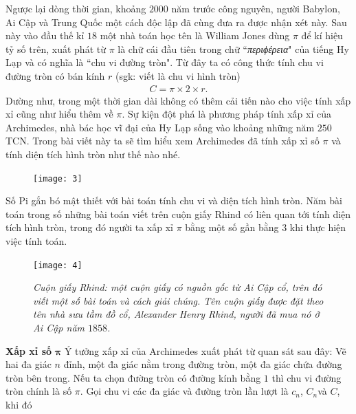 \begin{multicols}{2}
\begin{center}
{}
	\end{center}
	Ngược lại dòng thời gian, khoảng $2000$ năm trước công nguyên, người Babylon, Ai Cập và Trung Quốc một cách độc lập đã cùng đưa ra được nhận xét này. Sau này vào đầu thế kỉ $18$ một nhà toán học tên là William Jones dùng $\pi$ để kí hiệu tỷ số trên, xuất phát từ $\pi$ là chữ cái đầu tiên trong chữ ``\textit{περιϕέρεια}" của tiếng Hy Lạp và có nghĩa là ``chu vi đường tròn".
	\vskip 0.1cm
	Từ đây ta có công thức tính chu vi đường tròn có bán kính $r$ (sgk: viết là chu vi hình tròn)
	\begin{align*}
		C=\pi\times2\times r.
	\end{align*}
	Dường như, trong một thời gian dài không có thêm cải tiến nào cho việc tính xấp xỉ cũng như hiểu thêm về $\pi$. Sự kiện đột phá là phương pháp tính xấp xỉ của Archimedes, nhà bác học vĩ đại của Hy Lạp sống vào khoảng những năm $250$ TCN. Trong bài viết này ta sẽ tìm hiểu xem Archimedes đã tính xấp xỉ số $\pi$ và tính diện tích hình tròn như thế nào nhé.
	\begin{figure}[H]
		\vspace*{-5pt}
		\centering
		\captionsetup{labelformat= empty, justification=centering}
		\texttt{[image: 3]}
		\vspace*{-10pt}
	\end{figure}
	Số Pi gắn bó mật thiết với bài toán tính chu vi và diện tích hình tròn. Năm bài toán trong số những bài toán viết trên cuộn giấy Rhind  có liên quan tới tính diện tích hình tròn, trong đó người ta xấp xỉ $\pi$ bằng một số gần bằng $3$ khi thực hiện việc tính toán. 
	\begin{figure}[H]
		\vspace*{-5pt}
		\centering
		\captionsetup{labelformat= empty, justification=centering}
		\texttt{[image: 4]}
		\caption{\small\textit{\color{toancuabi}Cuộn giấy Rhind: một cuộn giấy có nguồn gốc từ Ai Cập cổ, trên đó viết một số bài toán và cách giải chúng. Tên cuộn giấy được đặt theo tên nhà sưu tầm đồ cổ, Alexander Henry Rhind, người đã mua nó ở Ai Cập năm $1858$.}}
		\vspace*{-10pt}
	\end{figure}
	\textbf{\color{toancuabi}Xấp xỉ số} $\pmb{\pi}$ 
	\vskip 0.1cm
	Ý tưởng xấp xỉ của Archimedes xuất phát từ quan sát sau đây: Vẽ hai  đa giác $n$ đỉnh, một đa giác nằm trong đường tròn, một đa giác chứa đường tròn bên trong. Nếu ta chọn đường tròn có đường kính bằng $1$ thì chu vi đường tròn chính là số $\pi$.  Gọi chu vi các đa giác và đường tròn lần lượt là $c_n$, $C_n $và $C$, khi đó

\end{multicols}
